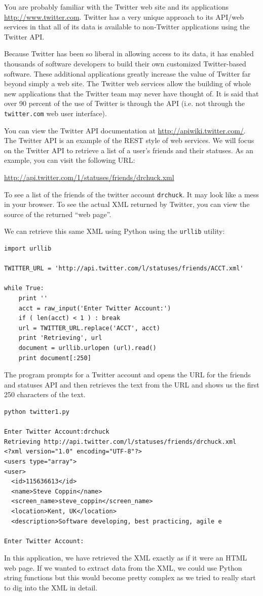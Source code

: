 \documentclass[11pt]{book}
\begin{document}
You are probably familiar with the Twitter web site and its
applications \url{http://www.twitter.com}.  Twitter has a very unique
approach to its API/web services in that all of its data is available
to non-Twitter applications using the Twitter API.

Because Twitter has been so liberal in allowing access to its data,
it has enabled thousands of software developers to build their own
customized Twitter-based software.  These additional applications greatly
increase the value of Twitter far beyond simply a web site.  The 
Twitter web services allow the building of whole new applications that
the Twitter team may never have thought of.  It is said that over 90 percent
of the use of Twitter is through the API (i.e. not through the {\tt twitter.com}
web user interface).

You can view the Twitter API documentation at 
\url{http://apiwiki.twitter.com/}.  The Twitter API is an example
of the REST style of web services.
We will focus on the Twitter API
to retrieve a list of a user's friends and their statuses.  As an 
example, you can visit the following URL:

\url{http://api.twitter.com/1/statuses/friends/drchuck.xml}

To see a list of the friends of the twitter account {\tt drchuck}.
It may look like a mess in your browser.   To see the actual XML
returned by Twitter, you can view the source of the returned
``web page''.

We can retrieve this same XML using Python using the {\tt urllib}
utility:

\beforeverb
\begin{verbatim}
import urllib

TWITTER_URL = 'http://api.twitter.com/l/statuses/friends/ACCT.xml'

while True:
    print ''
    acct = raw_input('Enter Twitter Account:')
    if ( len(acct) < 1 ) : break
    url = TWITTER_URL.replace('ACCT', acct)
    print 'Retrieving', url
    document = urllib.urlopen (url).read()
    print document[:250]
\end{verbatim}
\afterverb
%
The program prompts for a Twitter account and opens the URL
for the friends and statuses API and then retrieves the 
text from the URL and shows us the first 250 characters of
the text.

\beforeverb
\begin{verbatim}
python twitter1.py

Enter Twitter Account:drchuck
Retrieving http://api.twitter.com/l/statuses/friends/drchuck.xml
<?xml version="1.0" encoding="UTF-8"?>
<users type="array">
<user>
  <id>115636613</id>
  <name>Steve Coppin</name>
  <screen_name>steve_coppin</screen_name>
  <location>Kent, UK</location>
  <description>Software developing, best practicing, agile e

Enter Twitter Account:
\end{verbatim}
\afterverb
%
In this application, we have retrieved the XML exactly as if it were
an HTML web page.  If we wanted to extract data from the XML, we 
could use Python string functions but this would become pretty complex
as we tried to really start to dig into the XML in detail.
\end{document}
